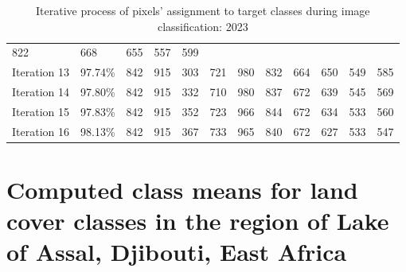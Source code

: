 \documentclass[jimaging,article,submit,pdftex,moreauthors]{Definitions/mdpi}
\begin{document}
\begin{table}[H]
\begin{tabularx}{\textwidth}{p{1.6cm}p{1.8cm}p{0.6cm}p{0.6cm}p{0.6cm}p{0.6cm}p{0.6cm}p{0.6cm}p{0.6cm}p{0.6cm}p{0.6cm}p{0.6cm}}
        822  &      668     &   655    &    557   &     599 \\
    Iteration 13 & 97.74\% & 842   &     915  &      303  &      721    &    980 &
        832     &   664  &      650     &   549    &    585 \\
    Iteration 14 & 97.80\% &  842   &     915   &     332    &    710 &       980 &
        837   &     672     &    639    &    545   &     569 \\
    Iteration 15 & 97.83\% & 842     &   915   &     352    &    723   &     966 &
        844    &    672  &      634     &   533    &    560 \\
    Iteration 16 & 98.13\% & 842   &     915     &   367     &   733 &       965 &
        840    &    672  &       627   &     533    &    547 \\
\bottomrule
\end{tabularx}
  \caption{Iterative process of pixels' assignment to target classes during image classification: 2023}
  \label{tabB4}
\end{table}

\section[\appendixname~\thesection]{Computed class means for land cover classes in the region of Lake of Assal, Djibouti, East Africa}\label{AppC}
\end{document}
